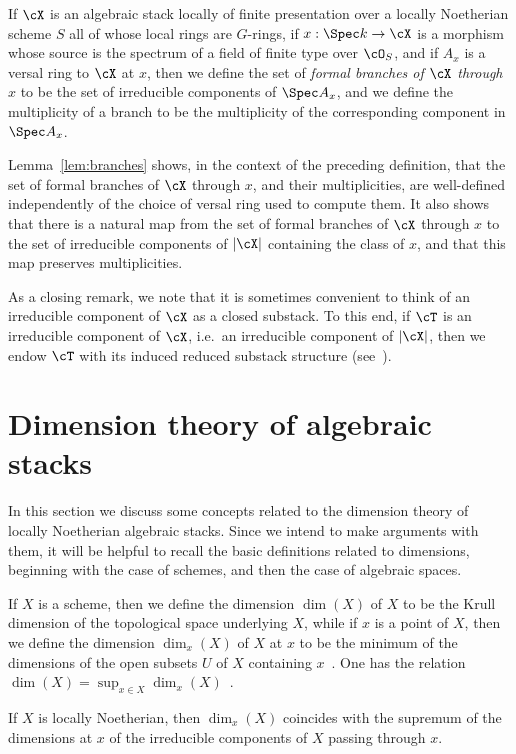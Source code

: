 \begin{adf}
If $\cX$ is an algebraic stack locally of finite presentation
over a locally Noetherian scheme $S$ all of whose local rings are $G$-rings,
if $x: \Spec k \to \cX$ is a morphism whose source is the spectrum
of a field of finite type over $\cO_S$,
and if $A_x$ is a versal ring to $\cX$ at $x$,
then we define the set of \emph{formal branches of $\cX$ through $x$} to be 
the set of irreducible components of $\Spec A_x$,
and we define the multiplicity of a branch to be the multiplicity
of the corresponding component in $\Spec A_x$.
\end{adf}

Lemma~\ref{lem:branches} shows, in the context of the preceding
definition, that the set of formal branches of $\cX$ through $x$,
and their multiplicities, are well-defined independently of
the choice of versal ring used to compute them.  It also
shows that there is a natural map from the set 
of formal branches of $\cX$ through $x$ to the set of irreducible
components of $|\cX|$ containing the class of $x$,
and that this map preserves multiplicities.






\medskip

As a closing remark,
we note that
it is sometimes convenient to think of an irreducible component of $\cX$ as a
closed substack. To this end, if $\cT$ is an irreducible component of $\cX$, i.e.\
an irreducible component of $|\cX|$, then we endow $\cT$ with its induced reduced
substack structure
(see~\cite[\href{http://stacks.math.columbia.edu/tag/050C}{Def.~050C}]{stacks-project}).


 \section{Dimension theory of algebraic stacks}\label{sec:appendix on
   dimension of algebraic stacks}
In this section we discuss some concepts related to the dimension
theory of locally Noetherian algebraic stacks.  
Since we intend to make arguments with them, it will be helpful
to recall the basic definitions related to dimensions,
beginning with the case of schemes, and then the case of algebraic spaces.

\begin{adf}
If $X$ is a scheme,
then we define the dimension $\dim(X)$ of $X$
to be the Krull dimension of the 
topological space underlying $X$,
while if $x$ is a point of $X$,
then we define the dimension $\dim_x (X)$ of $X$ at $x$ to be the 
minimum of the dimensions of the open subsets $U$ of $X$ containing
$x$~\cite[\href{http://stacks.math.columbia.edu/tag/04MT}{Def.~04MT}]
{stacks-project}.
One has the relation $\dim(X) = \sup_{x \in X}
\dim_x(X)$~\cite[\href{http://stacks.math.columbia.edu/tag/04MU}{Lem.~04MU}]
{stacks-project}.

If $X$ is locally Noetherian, then $\dim_x(X)$ coincides with the supremum 
of the dimensions at $x$
of the irreducible components of $X$ passing through $x$.
\end{adf}

